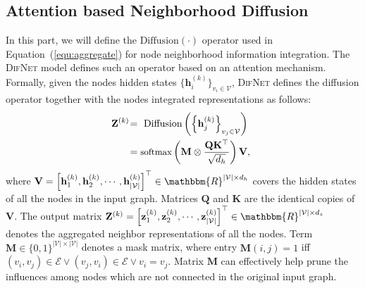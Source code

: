 \documentclass{article}
\newcommand{\mb}{\mathbf}
\newcommand{\mc}{\mathcal}
\newcommand{\our}{\textsc{DifNet}}
\begin{document}
\subsection{Attention based Neighborhood Diffusion}\label{subsec:aggregation}

In this part, we will define the $\mbox{Diffusion}(\cdot)$ operator used in Equation~(\ref{equ:aggregate}) for node neighborhood information integration. The {\our} model defines such an operator based on an attention mechanism. Formally, given the nodes hidden states $\{\mb{h}_i^{(k)}\}_{v_i \in \mc{V}}$, {\our} defines the diffusion operator together with the nodes integrated representations as follows:
\begin{equation}
\begin{aligned}
\hspace{-5pt} \mb{Z}^{(k)} \hspace{-2pt} &= \mbox{ Diffusion} \left( \left\{\mb{h}_j^{(k)} \right\}_{v_j \in \mc{V}} \right)\\
& =\mbox{\small softmax} \left( \mb{M} \otimes \frac{ \mb{Q} \mb{K}^\top }{\sqrt{d_h}} \right) \mb{V} , 
\end{aligned}
\end{equation}
where $\mb{V} = \left[\mb{h}_1^{(k)}, \mb{h}_2^{(k)}, \cdots, \mb{h}_{|\mc{V}|}^{(k)} \right]^\top  \in \mathbbm{R}^{|\mc{V}| \times d_h}$ covers the hidden states of all the nodes in the input graph. Matrices $\mb{Q}$ and $\mb{K}$ are the identical copies of $\mb{V}$. The output matrix $\mb{Z}^{(k)} = \left[\mb{z}_1^{(k)}, \mb{z}_2^{(k)}, \cdots, \mb{z}_{|\mc{V}|}^{(k)} \right]^\top \in \mathbbm{R}^{|\mc{V}| \times d_z}$ denotes the aggregated neighbor representations of all the nodes. Term $\mb{M} \in \{0, 1\}^{|\mc{V}| \times |\mc{V}|}$ denotes a mask matrix, where entry $\mb{M}(i,j) = 1$ iff $(v_i, v_j) \in \mc{E} \lor (v_j, v_i) \in \mc{E} \lor v_i = v_j$. Matrix $\mb{M}$ can effectively help prune the influences among nodes which are not connected in the original input graph.
\end{document}

